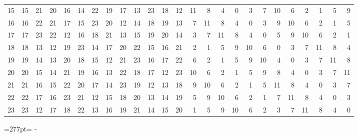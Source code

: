 \documentclass[10pt,a4paper]{article}
\newcommand{\needspace}[1]{\par\penalty-100\begingroup\dimen0=#1\relax\dimen2=\pagegoal
  \advance\dimen2-\pagetotal\ifdim\dimen0>\dimen2\relax\ifdim\dimen2>0pt\vfil\break\fi\fi
  \endgroup}
\numberwithin{equation}{section}
\begin{document}
{\begin{longtable}{@{}r|rrrrrrrrrrrrrrrrrrrrrrrr@{}}
15 & 15 & 21 & 20 & 16 & 14 & 22 & 19 & 17 & 13 & 23 & 18 & 12 & 11 & 8 & 4 & 0 & 3 & 7 & 10 & 6 & 2 & 1 & 5 & 9\\
16 & 16 & 22 & 21 & 17 & 15 & 23 & 20 & 12 & 14 & 18 & 19 & 13 & 7 & 11 & 8 & 4 & 0 & 3 & 9 & 10 & 6 & 2 & 1 & 5\\
17 & 17 & 23 & 22 & 12 & 16 & 18 & 21 & 13 & 15 & 19 & 20 & 14 & 3 & 7 & 11 & 8 & 4 & 0 & 5 & 9 & 10 & 6 & 2 & 1\\
18 & 18 & 13 & 12 & 19 & 23 & 14 & 17 & 20 & 22 & 15 & 16 & 21 & 2 & 1 & 5 & 9 & 10 & 6 & 0 & 3 & 7 & 11 & 8 & 4\\
19 & 19 & 14 & 13 & 20 & 18 & 15 & 12 & 21 & 23 & 16 & 17 & 22 & 6 & 2 & 1 & 5 & 9 & 10 & 4 & 0 & 3 & 7 & 11 & 8\\
20 & 20 & 15 & 14 & 21 & 19 & 16 & 13 & 22 & 18 & 17 & 12 & 23 & 10 & 6 & 2 & 1 & 5 & 9 & 8 & 4 & 0 & 3 & 7 & 11\\
21 & 21 & 16 & 15 & 22 & 20 & 17 & 14 & 23 & 19 & 12 & 13 & 18 & 9 & 10 & 6 & 2 & 1 & 5 & 11 & 8 & 4 & 0 & 3 & 7\\
22 & 22 & 17 & 16 & 23 & 21 & 12 & 15 & 18 & 20 & 13 & 14 & 19 & 5 & 9 & 10 & 6 & 2 & 1 & 7 & 11 & 8 & 4 & 0 & 3\\*
23 & 23 & 12 & 17 & 18 & 22 & 13 & 16 & 19 & 21 & 14 & 15 & 20 & 1 & 5 & 9 & 10 & 6 & 2 & 3 & 7 & 11 & 8 & 4 & 0\\
\bottomrule\end{longtable}}
\needspace{277pt}
\end{document}
